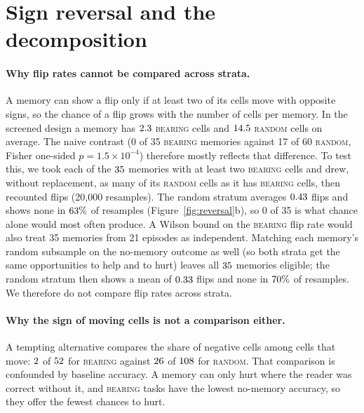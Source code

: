 \section{Sign reversal and the decomposition}
\label{sec:negative}
\paragraph{Why flip rates cannot be compared across strata.}
A memory can show a flip only if at least two of its cells move with opposite
signs, so the chance of a flip grows with the number of cells per memory. In
the screened design a memory has $2.3$ \textsc{bearing} cells
and $14.5$ \textsc{random} cells on average. The naive
contrast (0 of 35 \textsc{bearing} memories against 17 of 60 \textsc{random},
Fisher one-sided $p = 1.5\times10^{-4}$) therefore mostly reflects that
difference. To test this, we took each of the $35$ memories with at
least two \textsc{bearing} cells and drew, without replacement, as many of its
\textsc{random} cells as it has \textsc{bearing} cells, then recounted flips
(20{,}000 resamples). The random stratum averages $0.43$ flips and
shows none in $63\%$ of resamples (Figure~\ref{fig:reversal}b), so
0 of 35 is what chance alone would most often produce. A Wilson bound on the \textsc{bearing} flip rate would also treat 35 memories
from 21 episodes as independent.
Matching each memory's random subsample on the no-memory outcome as well (so
both strata get the same opportunities to help and to hurt) leaves all
$35$ memories eligible; the random stratum then shows a mean of
$0.33$ flips and none in $70\%$ of resamples. We
therefore do not compare flip rates across strata.

\paragraph{Why the sign of moving cells is not a comparison either.}
A tempting alternative compares the share of negative cells among cells that
move: $2$ of $52$ for \textsc{bearing} against
$26$ of $108$ for \textsc{random}. That comparison is
confounded by baseline accuracy. A memory can only hurt where the reader was
correct without it, and \textsc{bearing} tasks have the lowest no-memory
accuracy, so they offer the fewest chances to hurt.

